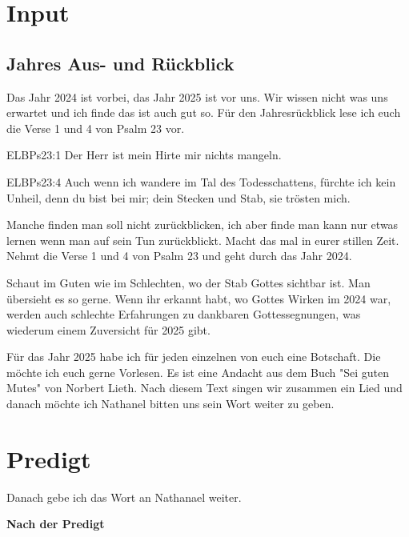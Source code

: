 \documentclass{../inc/mybib}
\begin{document}
\section{ Input }
\begin{spacing}{1.5}
\subsection{ Jahres Aus- und Rückblick}

Das Jahr 2024 ist vorbei, das Jahr 2025 ist vor uns. Wir wissen nicht was uns erwartet und ich finde das ist auch gut so. Für den Jahresrückblick lese ich euch die Verse 1 und 4 von Psalm 23 vor.

\begin{bibeltext}{ELB}{Ps}{23:1}
Der Herr ist mein Hirte mir nichts mangeln.
\end{bibeltext}
\begin{bibeltext}{ELB}{Ps}{23:4}
Auch wenn ich wandere im Tal des Todesschattens, fürchte ich kein Unheil, denn du bist bei mir; dein Stecken und Stab, sie trösten mich.
\end{bibeltext}

Manche finden man soll nicht zurückblicken, ich aber finde man kann nur etwas lernen wenn man auf sein Tun zurückblickt. Macht das mal in eurer stillen Zeit. Nehmt die Verse 1 und 4 von Psalm 23 und geht durch das Jahr 2024. 

Schaut im Guten wie im Schlechten, wo der Stab Gottes sichtbar ist. Man übersieht es so gerne. Wenn ihr erkannt habt, wo Gottes Wirken im 2024 war, werden auch schlechte Erfahrungen zu dankbaren Gottessegnungen, was wiederum einem Zuversicht für 2025 gibt.

Für das Jahr 2025 habe ich für jeden einzelnen von euch eine Botschaft. Die möchte ich euch gerne Vorlesen. Es ist eine Andacht aus dem Buch "Sei guten Mutes" von Norbert Lieth.
Nach diesem Text singen wir zusammen ein Lied und danach möchte ich Nathanel bitten uns sein Wort weiter zu geben.

\end{spacing}


\section{Predigt}

Danach gebe ich das Wort an Nathanael weiter.

\textbf{Nach der Predigt}
\end{document}
